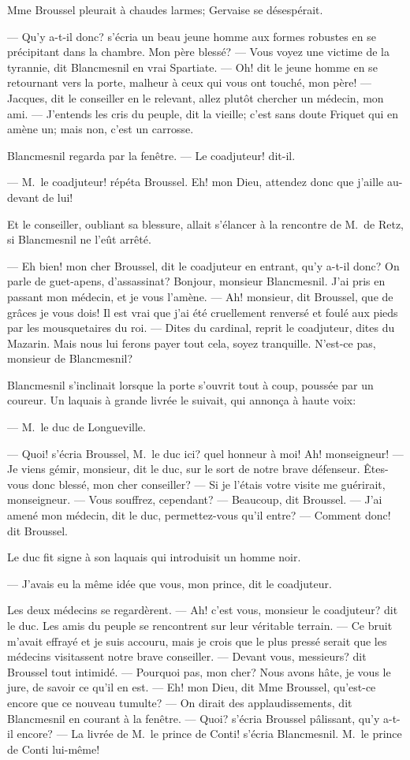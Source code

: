 Mme Broussel pleurait à chaudes larmes; Gervaise se désespérait.

— Qu'y a-t-il donc? s'écria un beau jeune homme aux formes robustes en se précipitant dans la chambre. Mon père blessé? — Vous voyez une victime de la tyrannie, dit Blancmesnil en vrai Spartiate. — Oh! dit le jeune homme en se retournant vers la porte, malheur à ceux qui vous ont touché, mon père! — Jacques, dit le conseiller en le relevant, allez plutôt chercher un médecin, mon ami. — J'entends les cris du peuple, dit la vieille; c'est sans doute Friquet qui en amène un; mais non, c'est un carrosse.

Blancmesnil regarda par la fenêtre. — Le coadjuteur! dit-il.

— M.~le coadjuteur! répéta Broussel. Eh! mon Dieu, attendez donc que j'aille au-devant de lui!

Et le conseiller, oubliant sa blessure, allait s'élancer à la rencontre de M.~de Retz, si Blancmesnil ne l'eût arrêté.

— Eh bien! mon cher Broussel, dit le coadjuteur en entrant, qu'y a-t-il donc? On parle de guet-apens, d'assassinat? Bonjour, monsieur Blancmesnil. J'ai pris en passant mon médecin, et je vous l'amène. — Ah! monsieur, dit Broussel, que de grâces je vous dois! Il est vrai que j'ai été cruellement renversé et foulé aux pieds par les mousquetaires du roi. — Dites du cardinal, reprit le coadjuteur, dites du Mazarin. Mais nous lui ferons payer tout cela, soyez tranquille. N'est-ce pas, monsieur de Blancmesnil?

Blancmesnil s'inclinait lorsque la porte s'ouvrit tout à coup, poussée par un coureur. Un laquais à grande livrée le suivait, qui annonça à haute voix:

— M.~le duc de Longueville.

— Quoi! s'écria Broussel, M.~le duc ici? quel honneur à moi! Ah! monseigneur! — Je viens gémir, monsieur, dit le duc, sur le sort de notre brave défenseur. Êtes-vous donc blessé, mon cher conseiller? — Si je l'étais votre visite me guérirait, monseigneur. — Vous souffrez, cependant? — Beaucoup, dit Broussel. — J'ai amené mon médecin, dit le duc, permettez-vous qu'il entre? — Comment donc! dit Broussel.

Le duc fit signe à son laquais qui introduisit un homme noir.

— J'avais eu la même idée que vous, mon prince, dit le coadjuteur.

Les deux médecins se regardèrent. — Ah! c'est vous, monsieur le coadjuteur? dit le duc. Les amis du peuple se rencontrent sur leur véritable terrain. — Ce bruit m'avait effrayé et je suis accouru, mais je crois que le plus pressé serait que les médecins visitassent notre brave conseiller. — Devant vous, messieurs? dit Broussel tout intimidé. — Pourquoi pas, mon cher? Nous avons hâte, je vous le jure, de savoir ce qu'il en est. — Eh! mon Dieu, dit Mme Broussel, qu'est-ce encore que ce nouveau tumulte? — On dirait des applaudissements, dit Blancmesnil en courant à la fenêtre. — Quoi? s'écria Broussel pâlissant, qu'y a-t-il encore? — La livrée de M.~le prince de Conti! s'écria Blancmesnil. M.~le prince de Conti lui-même!

